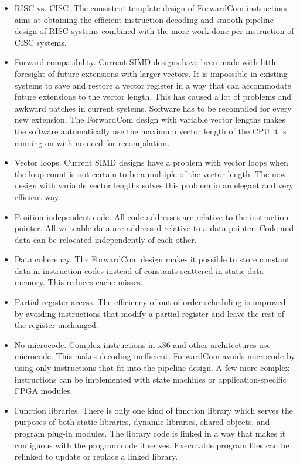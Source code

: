 \documentclass[forwardcom.tex]{subfiles}
\begin{document}
\begin{itemize}
\item RISC vs. CISC. The consistent template design of ForwardCom instructions aims at obtaining the efficient instruction decoding and smooth pipeline design of RISC systems combined with the more work done per instruction of CISC systems.

\item Forward compatibility. Current SIMD designs have been made with little foresight of future extensions with larger vectors. It is impossible in existing systems to save and restore a vector register in a way that can accommodate future extensions to the vector length. This has caused a lot of problems and awkward patches in current systems. Software has to be recompiled for every new extension. The ForwardCom design with variable vector lengths makes the software automatically use the maximum vector length of the CPU it is running on with no need for recompilation.

\item Vector loops. Current SIMD designs have a problem with vector loops when the loop count is not certain to be a multiple of the vector length. The new design with variable vector lengths solves this problem in an elegant and very efficient way.

\item Position independent code. All code addresses are relative to the instruction pointer. All writeable data are addressed relative to a data  pointer. Code and data can be relocated independently of each other.

\item Data coherency. The ForwardCom design makes it possible to store constant data in instruction codes instead of constants scattered in static data memory. This reduces cache misses.

\item Partial register access. The efficiency of out-of-order scheduling is improved by avoiding instructions that modify a partial register and leave the rest of the register unchanged.

\item No microcode. Complex instructions in x86 and other architectures use microcode. This makes decoding inefficient. ForwardCom avoids microcode by using only instructions that fit into the pipeline design. A few more complex instructions can be implemented with state machines or application-specific FPGA modules.

\item Function libraries. There is only one kind of function library which serves the purposes of both static libraries, dynamic libraries, shared objects, and program plug-in modules. The library code is linked in a way that makes it contiguous with the program code it serves. Executable program files can be relinked to update or replace a linked library.


\end{itemize}
\end{document}
